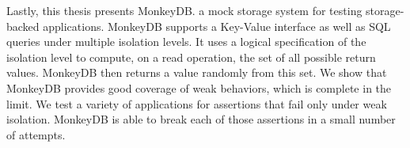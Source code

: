 Lastly, this thesis presents MonkeyDB. a mock storage system for testing storage-backed
applications. MonkeyDB supports a Key-Value interface as well as SQL queries
under multiple isolation levels. It uses a logical specification of the isolation
level to compute, on a read operation, the set of all possible return values.
MonkeyDB then returns a value randomly from this set. 
We show that MonkeyDB provides 
good coverage of weak behaviors, which is complete in the limit. We test a
variety of applications for assertions that fail only under weak isolation.
MonkeyDB is able to break each of those assertions in a small number of attempts. 